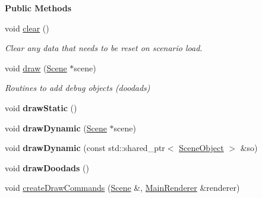 \begin{Indent}\textbf{ Public Methods}\par
\begin{DoxyCompactItemize}
\item 
\mbox{\label{classrev_1_1_debug_manager_af3123f8d62ff3e8d155c4e7755f2bb56}} 
void \mbox{\hyperlink{classrev_1_1_debug_manager_af3123f8d62ff3e8d155c4e7755f2bb56}{clear}} ()
\begin{DoxyCompactList}\small\item\em Clear any data that needs to be reset on scenario load. \end{DoxyCompactList}\item 
void \mbox{\hyperlink{classrev_1_1_debug_manager_aa7e0385a031c216c48f6bf1d9ca2a9da}{draw}} (\mbox{\hyperlink{classrev_1_1_scene}{Scene}} $\ast$scene)
\begin{DoxyCompactList}\small\item\em Routines to add debug objects (doodads) \end{DoxyCompactList}\item 
\mbox{\label{classrev_1_1_debug_manager_aa76077af77acb77425f46380a73be7a1}} 
void {\bfseries draw\+Static} ()
\item 
\mbox{\label{classrev_1_1_debug_manager_afb4b5bdfdabdbbaab06f1f3acd3c7b34}} 
void {\bfseries draw\+Dynamic} (\mbox{\hyperlink{classrev_1_1_scene}{Scene}} $\ast$scene)
\item 
\mbox{\label{classrev_1_1_debug_manager_a3d1ed2038a3cc09312c8e1f4aaebfaf5}} 
void {\bfseries draw\+Dynamic} (const std\+::shared\+\_\+ptr$<$ \mbox{\hyperlink{classrev_1_1_scene_object}{Scene\+Object}} $>$ \&so)
\item 
\mbox{\label{classrev_1_1_debug_manager_a93627c1f6fa983668aa8666fbc6cbf94}} 
void {\bfseries draw\+Doodads} ()
\item 
\mbox{\label{classrev_1_1_debug_manager_a50a6bcd3a6a8f12d38b792ca64a31a63}} 
void \mbox{\hyperlink{classrev_1_1_debug_manager_a50a6bcd3a6a8f12d38b792ca64a31a63}{create\+Draw\+Commands}} (\mbox{\hyperlink{classrev_1_1_scene}{Scene}} \&, \mbox{\hyperlink{classrev_1_1_main_renderer}{Main\+Renderer}} \&renderer)

\end{DoxyCompactItemize}
\end{Indent}
